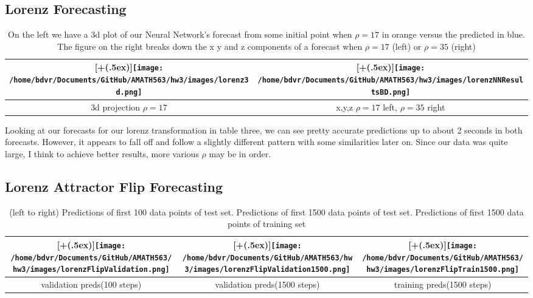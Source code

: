 \documentclass[12pt]{article}
\newcommand*{\addheight}[2][.5ex]{%
	\raisebox{0pt}[\dimexpr\height+(#1)\relax]{#2}%
}
\begin{document}
\subsection{Lorenz Forecasting}
\begin{table}[H]
	\begin{center}
		\begin{tabular*}{0.98\linewidth}{|c|c|}
			\hline
			\addheight{\texttt{[image: /home/bdvr/Documents/GitHub/AMATH563/hw3/images/lorenz3d.png]}} 
			&
			\addheight{\texttt{[image: /home/bdvr/Documents/GitHub/AMATH563/hw3/images/lorenzNNResultsBD.png]}}
			\\
			\hline
			\small 3d projection $\rho = 17$ &  			
			\small x,y,z $\rho =17$ left, $\rho = 35$ right
		\\
			\hline

		\end{tabular*}
		\caption{On the left we have a 3d plot of our Neural Network's forecast from some initial point when $\rho = 17$ in orange versus the predicted in blue. The figure on the right breaks down the x y and z components of a forecast when $\rho =17$ (left) or $\rho = 35$ (right)}
	\end{center}
\end{table}
\vspace*{-\baselineskip}\vspace*{-\baselineskip}
Looking at our forecasts for our lorenz transformation in table three, we can see pretty accurate predictions up to about 2 seconds in both forecasts. However, it appears to fall off and follow a slightly different pattern with some similarities later on. Since our data was quite large, I think to achieve better results, more various $\rho$ may be in order.
\subsection{Lorenz Attractor Flip Forecasting}
\begin{table}[H]
	\begin{center}
		\begin{tabular*}{0.98\linewidth}{|c|c|c|}
			\hline
			\addheight{\texttt{[image: /home/bdvr/Documents/GitHub/AMATH563/hw3/images/lorenzFlipValidation.png]}} 
			&
			\addheight{\texttt{[image: /home/bdvr/Documents/GitHub/AMATH563/hw3/images/lorenzFlipValidation1500.png]}}
			&
			\addheight{\texttt{[image: /home/bdvr/Documents/GitHub/AMATH563/hw3/images/lorenzFlipTrain1500.png]}}
			\\
			\hline
			\small validation preds(100 steps) &  			
			\small validation preds(1500 steps)  &
			\small  training preds(1500 steps)\\
			\hline
		\end{tabular*}
		\caption{(left to right) Predictions of first 100 data points of test set. Predictions of first 1500 data points of test set. Predictions of first 1500 data points of training set}
	\end{center}
\end{table}
\vspace*{-\baselineskip}\vspace*{-\baselineskip}
\end{document}
